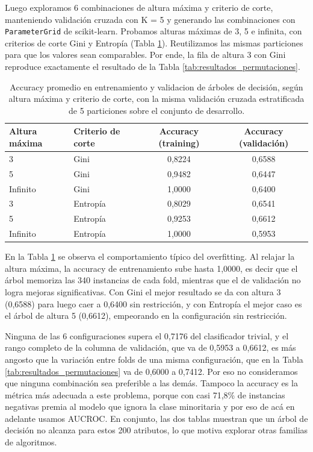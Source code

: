 \documentclass[10pt,a4paper]{article}
\begin{document}
Luego exploramos 6 combinaciones de altura máxima y criterio de corte, manteniendo validación cruzada con K = 5 y generando las combinaciones con \texttt{ParameterGrid} de scikit-learn. 
Probamos alturas máximas de 3, 5 e infinita, con criterios de corte Gini y Entropía (Tabla \ref{tab:accuracy_arboles}).
Reutilizamos las mismas particiones para que los valores sean comparables. Por ende, la fila de altura 3 con Gini reproduce exactamente el resultado de la Tabla \ref{tab:resultados_permutaciones}. 

\begin{table}[H]
\centering
\begin{tabular}{llcc}
\toprule
\textbf{Altura máxima} & \textbf{Criterio de corte} & \textbf{Accuracy (training)} & \textbf{Accuracy (validación)} \\
\midrule
3        & Gini     & 0,8224 & 0,6588 \\
5        & Gini     & 0,9482 & 0,6447 \\
Infinito & Gini     & 1,0000 & 0,6400 \\
3        & Entropía & 0,8029 & 0,6541 \\
5        & Entropía & 0,9253 & 0,6612 \\
Infinito & Entropía & 1,0000 & 0,5953 \\
\bottomrule
\end{tabular}
\caption{Accuracy promedio en entrenamiento y validacion de árboles de decisión, según altura máxima y criterio de corte, con la misma validación cruzada estratificada de 5 particiones sobre el conjunto de desarrollo.}
\label{tab:accuracy_arboles}
\end{table}



En la Tabla \ref{tab:accuracy_arboles} se observa el comportamiento típico del overfitting. Al relajar la altura máxima, la accuracy de entrenamiento sube hasta 1,0000, es decir que el árbol memoriza las 340 instancias de cada fold, mientras que el de validación no logra mejoras significativas. Con Gini el mejor resultado se da con altura 3 (0,6588) para luego caer a 0,6400 sin restricción, y con Entropía el mejor caso es el árbol de altura 5 (0,6612), empeorando en la configuración sin restricción.

Ninguna de las 6 configuraciones supera el 0,7176 del clasificador trivial, y el rango completo de la columna de validación, que va de 0,5953 a 0,6612, es más angosto que la variación entre folds de una misma configuración, que en la Tabla \ref{tab:resultados_permutaciones} va de 0,6000 a 0,7412. Por eso no consideramos que ninguna combinación sea preferible a las demás. Tampoco la accuracy es la métrica más adecuada a este problema, porque con casi 71,8\% de instancias negativas premia al modelo que ignora la clase minoritaria y por eso de acá en adelante usamos AUCROC. En conjunto, las dos tablas muestran que un árbol de decisión no alcanza para estos 200 atributos, lo que motiva explorar otras familias de algoritmos.
\end{document}
